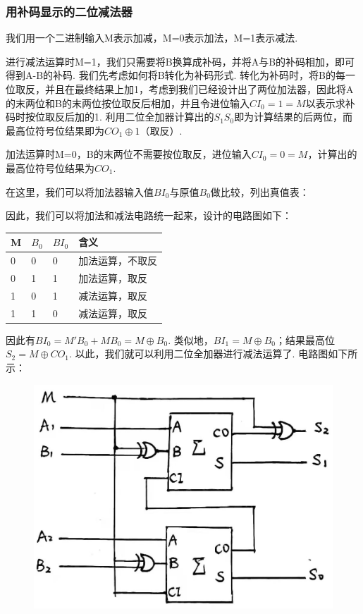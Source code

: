 \documentclass[UTF8]{ctexart}
\begin{document}
{\subsubsection{用补码显示的二位减法器}
我们用一个二进制输入M表示加减，M=0表示加法，M=1表示减法. \par
进行减法运算时M=1，我们只需要将B换算成补码，并将A与B的补码相加，即可得到A-B的补码. 我们先考虑如何将B转化为补码形式. 转化为补码时，将B的每一位取反，并且在最终结果上加1，考虑到我们已经设计出了两位加法器，因此将A的末两位和B的末两位按位取反后相加，并且令进位输入$CI_0=1=M$以表示求补码时按位取反后加的1. 利用二位全加器计算出的$S_1S_0$即为计算结果的后两位，而最高位符号位结果即为$CO_1\oplus 1$（取反）.\par
加法运算时M=0，B的末两位不需要按位取反，进位输入$CI_0=0=M$，计算出的最高位符号位结果为$CO_1$. \par
在这里，我们可以将加法器输入值$BI_0$与原值$B_0$做比较，列出真值表：

因此，我们可以将加法和减法电路统一起来，设计的电路图如下：
\begin{table}[H]
    \label{biao}
    \begin{center}
    \begin{tabular}{p{4em}<{\centering}|p{4em}<{\centering}|p{4em}<{\centering}|p{12em}<{\centering}}
        \hline\hline
        M&$B_0$&$BI_0$&含义\\
        \hline
        0&0&0&加法运算，不取反\\
        \hline
        0&1&1&加法运算，取反\\
        \hline
        1&0&1&减法运算，取反\\
        \hline
        1&1&0&减法运算，取反\\
        \hline
    \end{tabular}
\end{center}
\end{table}
因此有$BI_0=M'B_0+MB_0=M\oplus B_0$. 类似地，$BI_1=M\oplus B_0$；结果最高位$S_2=M\oplus CO_1$.
以此，我们就可以利用二位全加器进行减法运算了. 电路图如下所示：
\begin{figure}[H]\begin{center}
    \includegraphics[scale=0.25]{4.jpg}
\end{center}\end{figure}

}
\end{document}
